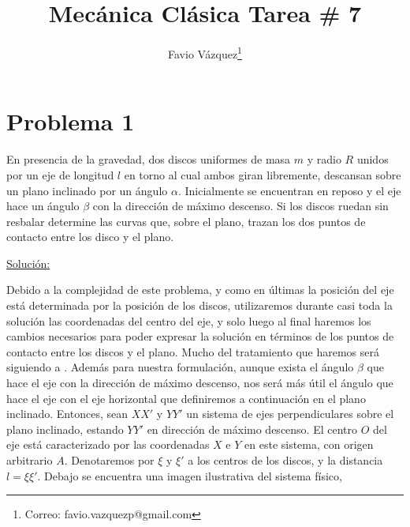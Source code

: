 \documentclass[a4paper,10pt]{article}
\title{Mecánica Clásica Tarea \# 7}
\author{Favio Vázquez\thanks{Correo: favio.vazquezp@gmail.com}}\affil{Instituto de Ciencias Nucleares. Universidad Nacional Autónoma de México.}
\date{}
\numberwithin{equation}{section}
\begin{document}
\makeatletter
\def\@maketitle{%
  \newpage
  \null
  \vskip 2em%
  \begin{center}%
  \let \footnote \thanks
    {\Large\bfseries \@title \par}%
    \vskip 1.5em%
    {\normalsize
      \lineskip .5em%
      \begin{tabular}[t]{c}%
        \@author
      \end{tabular}\par}%
    \vskip 1em%
    {\normalsize \@date}%
  \end{center}%
  \par
  \vskip 1.5em}
\makeatother

\maketitle

\section{Problema 1}

En presencia de la gravedad, dos discos uniformes de masa $m$ y radio $R$ unidos por 
un eje de longitud $l$ en torno al cual ambos giran libremente, descansan sobre un plano 
inclinado por un ángulo $\alpha$. Inicialmente se encuentran en reposo y el eje hace un ángulo 
$\beta$ con la dirección de máximo descenso. Si los discos ruedan sin resbalar determine 
las curvas que, sobre el plano, trazan los dos puntos de contacto entre los disco y el plano.

\vspace{.3cm}

\underline{Solución:} \vspace{.3cm}

Debido a la complejidad de este problema, y como en últimas la posición del eje 
está determinada por la posición de los discos, utilizaremos durante casi toda la solución 
las coordenadas del centro del eje, y solo luego al final haremos los cambios necesarios 
para poder expresar la solución en términos de los puntos de contacto entre los 
discos y el plano. Mucho del tratamiento que haremos será siguiendo a \cite{ginoux}. Además para nuestra formulación, aunque 
exista el ángulo $\beta$ que hace el eje con la dirección de máximo descenso, nos será 
más útil el ángulo que hace el eje con el eje horizontal que definiremos a continuación 
en el plano inclinado. Entonces, sean $XX'$ y $YY'$ un sistema de ejes perpendiculares 
sobre el plano inclinado, estando $YY'$ en dirección de máximo descenso. El centro 
$O$ del eje está caracterizado por las coordenadas $X$ e $Y$ en este sistema, con 
origen arbitrario $A$. Denotaremos por $\xi$ y $\xi'$ a los centros de los discos, y la 
distancia $l=\xi\xi'$. Debajo se encuentra una imagen ilustrativa del sistema físico,
\end{document}
